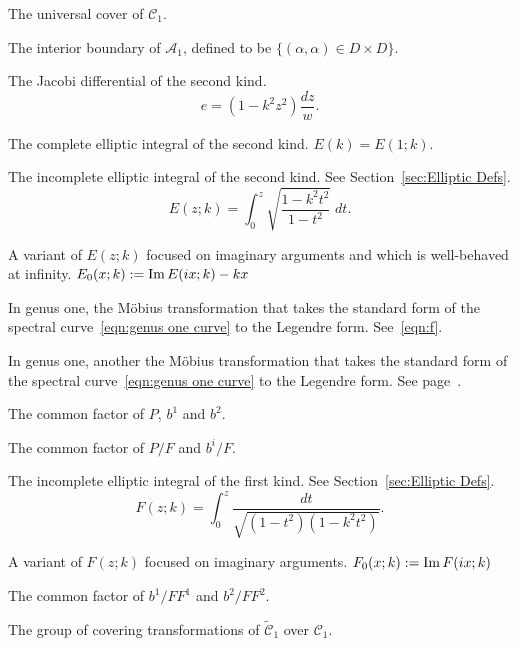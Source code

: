 \begin{description}[align=right]
\item[$\mathcal{\tilde{C}}_1$] The universal cover of $\mathcal{C}_1$.

\item[$\mathcal{D}$] The interior boundary of $\mathcal{A}_1$, defined to be $\{ (α,α) \in D \times D\}$.

\item[$e$] The Jacobi differential of the second kind.
\[
e = (1-k^2z^2) \frac{dz}{w}.
\]

\item[$E(k)$] The complete elliptic integral of the second kind. $E(k) = E(1;k)$.

\item[$E(z;k)$] The incomplete elliptic integral of the second kind. See Section~\ref{sec:Elliptic Defs}.
\[
E(z;k) = \int_0^z \sqrt{\frac{1-k^2 t^2}{1-t^2}} \;dt.
\]

\item[$E_0(x;k)$] A variant of $E(z;k)$ focused on imaginary arguments and which is well-behaved at infinity. $E_0 (x ; k) := \operatorname{Im} E(i x; k) - kx$

\item[$f(ζ)$] In genus one, the Möbius transformation that takes the standard form of the spectral curve~\eqref{eqn:genus one curve} to the Legendre form. See~\eqref{eqn:f}.

\item[$f_s(ζ)$] In genus one, another the Möbius transformation that takes the standard form of the spectral curve~\eqref{eqn:genus one curve} to the Legendre form. See page~\pageref{para:def f_s}.

\item[$F$] The common factor of $P$, $b^1$ and $b^2$.
\item[$F^i$] The common factor of $P/F$ and $b^i/F$.

\item[$F(z;k)$] The incomplete elliptic integral of the first kind. See Section~\ref{sec:Elliptic Defs}.
\[
F(z;k) = \int_0^z \frac{dt}{\sqrt{(1-t^2)(1-k^2 t^2)}}.
\]

\item[$F_0(x;k)$] A variant of $F(z;k)$ focused on imaginary arguments. $F_0 (x ; k) := \operatorname{Im} F(i x; k)$

\item[$G$] The common factor of $b^1/FF^1$ and $b^2/FF^2$.

\item[$\mathcal{G}$] The group of covering transformations of $\mathcal{\tilde{C}}_1$ over $\mathcal{C}_1$.


\end{description}

